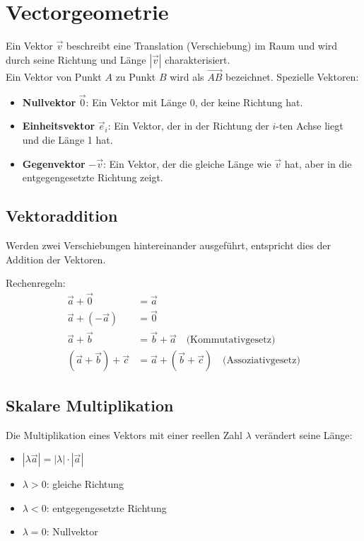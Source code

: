 \section{Vectorgeometrie}
Ein Vektor \(\vec{v}\) beschreibt eine Translation (Verschiebung) im Raum und wird durch seine Richtung und Länge \(|\vec{v}|\) charakterisiert.\\
Ein Vektor von Punkt \(A\) zu Punkt \(B\) wird als \(\overrightarrow{AB}\) bezeichnet. Spezielle Vektoren:
\begin{itemize}
     \item \textbf{Nullvektor} \(\vec{0}\): Ein Vektor mit Länge 0, der keine Richtung hat.
     \item \textbf{Einheitsvektor} \(\vec{e}_i\): Ein Vektor, der in der Richtung der \(i\)-ten Achse liegt und die Länge 1 hat.
     \item \textbf{Gegenvektor} \(-\vec{v}\): Ein Vektor, der die gleiche Länge wie \(\vec{v}\) hat, aber in die entgegengesetzte Richtung zeigt.
\end{itemize}

\subsection{Vektoraddition}
Werden zwei Verschiebungen hintereinander ausgeführt, entspricht dies der Addition der Vektoren.

Rechenregeln:
\begin{align*}
     \vec a + \vec 0            & = \vec a                                                     \\
     \vec a + (-\vec a)         & = \vec 0                                                     \\
     \vec a + \vec b            & = \vec b + \vec a \quad \text{(Kommutativgesetz)}            \\
     (\vec a + \vec b) + \vec c & = \vec a + (\vec b + \vec c) \quad \text{(Assoziativgesetz)}
\end{align*}

\subsection{Skalare Multiplikation}
Die Multiplikation eines Vektors mit einer reellen Zahl $\lambda$ verändert seine Länge:

\begin{itemize}
     \item $|\lambda \vec a| = |\lambda| \cdot |\vec a|$
     \item $\lambda > 0$: gleiche Richtung
     \item $\lambda < 0$: entgegengesetzte Richtung
     \item $\lambda = 0$: Nullvektor
\end{itemize}

